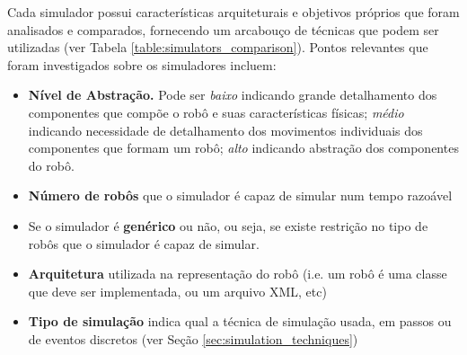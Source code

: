 Cada simulador possui características arquiteturais e objetivos próprios que foram analisados e comparados, fornecendo um arcabouço de técnicas que podem ser utilizadas (ver Tabela \ref{table:simulators_comparison}). Pontos relevantes que foram investigados sobre os simuladores incluem: 

\begin{itemize}
    \item \textbf{Nível de Abstração.} Pode ser \emph{baixo} indicando grande detalhamento dos componentes que compõe o robô e suas características físicas; \emph{médio} indicando necessidade de detalhamento dos movimentos individuais dos componentes que formam um robô; \emph{alto} indicando abstração dos componentes do robô.
    \item \textbf{Número de robôs} que o simulador é capaz de simular num tempo razoável
    \item Se o simulador é \textbf{genérico} ou não, ou seja, se existe restrição no tipo de robôs que o simulador é capaz de simular.
    \item \textbf{Arquitetura} utilizada na representação do robô (i.e. um robô é uma classe que deve ser implementada, ou um arquivo XML, etc)
    \item \textbf{Tipo de simulação} indica qual a técnica de simulação usada, em passos ou de eventos discretos (ver Seção \ref{sec:simulation_techniques})
\end{itemize}

